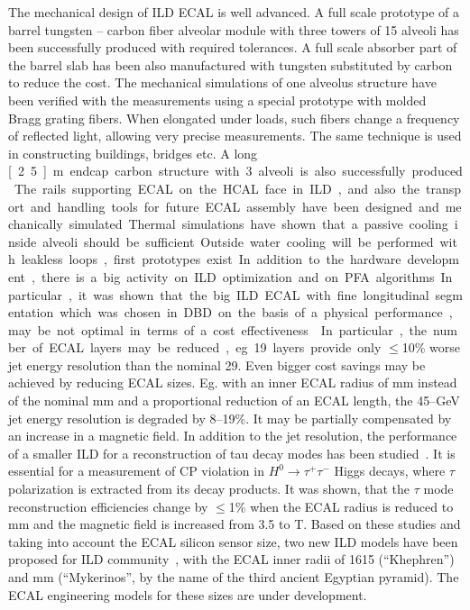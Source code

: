 The mechanical design of ILD ECAL is well advanced. A full scale prototype of
a barrel tungsten -- carbon fiber alveolar module with three towers of 15
alveoli has been successfully produced with required tolerances. A full scale
absorber part of the barrel slab has been also manufactured with tungsten
substituted by carbon to reduce the cost. The mechanical simulations of one
alveolus structure have been verified with the measurements using a special
prototype with molded Bragg grating fibers. When elongated under loads, such
fibers change a frequency of reflected light, allowing very precise
measurements. The same technique is used in constructing buildings, bridges
etc. A long \unit[2.5]{m} endcap carbon structure with 3 alveoli is also
successfully produced. The rails supporting ECAL on the HCAL face in ILD, and
also the transport and handling tools for future ECAL assembly have been
designed and mechanically simulated.

Thermal simulations have shown that a passive cooling inside alveoli should be
sufficient. Outside water cooling will be performed with leakless loops, first
prototypes exist.

In addition to the hardware development, there is a big activity on ILD
optimization and on PFA algorithms. In particular, it was shown that the big
ILD ECAL with fine longitudinal segmentation which was chosen in DBD on the
basis of a physical performance, may be not optimal in terms of a cost
effectiveness~\cite{Tran:2014hma,MarshallPandoraSiW:2013}. In particular, the number of ECAL layers may be
reduced, eg. 19 layers provide only $\le$10\% worse jet energy resolution than
the nominal 29. Even bigger cost savings may be achieved by reducing ECAL
sizes. Eg. with an inner ECAL radius of \unit[1400]{mm} instead of the nominal \unit[1843]{mm}
and a proportional reduction of an ECAL length, the 45--\unit[250]{GeV} jet energy
resolution is degraded by 8--19\%. It may be partially compensated by an
increase in a magnetic field. In addition to the jet resolution, the
performance of a smaller ILD for a reconstruction of tau decay modes has been
studied~\cite{SueharaTauRecoALCW2015}. It is essential for a measurement of CP violation in
$H^0\to \tau^+\tau^-$ Higgs decays, where $\tau$ polarization is extracted
from its decay products. It was shown, that the $\tau$ mode reconstruction
efficiencies change by $\le$1\% when the ECAL radius is reduced to \unit[1450]{mm} and
the magnetic field is increased from 3.5 to \unit[4]{T}. Based on these studies and
taking into account the ECAL silicon sensor size, two new ILD models have been
proposed for ILD community~\cite{VideauALCW2015}, with the ECAL inner radii of
1615 (``Khephren'') and \unit[1480]{mm} (``Mykerinos'', by the name of the third
ancient Egyptian pyramid). The ECAL engineering models for these sizes are
under development.

